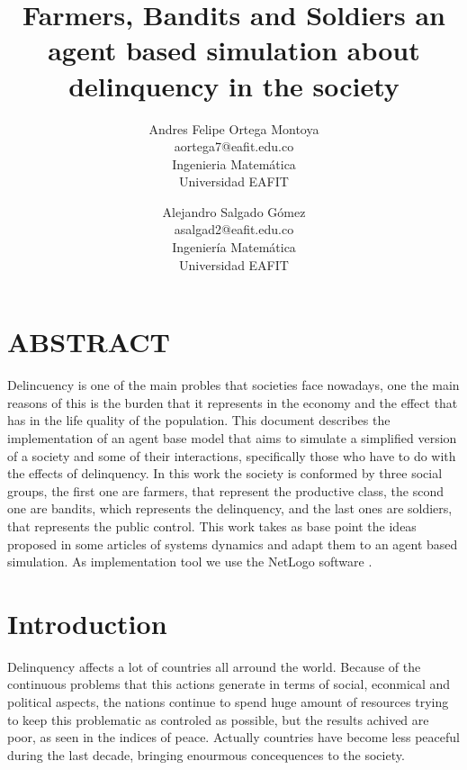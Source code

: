 \documentclass{wscpaperproc}
\theoremstyle{wsc}
\begin{document}

\title{Farmers, Bandits and Soldiers an agent based simulation about delinquency in the
       society}

\author{Andres Felipe Ortega Montoya\\ [12pt]
aortega7@eafit.edu.co\\
Ingenieria Matemática\\
Universidad EAFIT\\
\and
Alejandro Salgado Gómez\\[12pt]
asalgad2@eafit.edu.co\\
Ingeniería Matemática\\
Universidad EAFIT\\
}

\maketitle

\section*{ABSTRACT}
Delincuency is one of the main probles that societies face nowadays,
one the main reasons of this is the burden that it represents in the
economy and the effect that has in the life quality of the population.
This document describes the implementation of an agent base model that aims to
simulate a simplified version of a society and some of their interactions,
specifically those who have to do with the effects of delinquency.
In this work the society is conformed by three social groups, the
first one are farmers, that represent the productive class, the scond
one are bandits, which represents the delinquency, and the last ones
are soldiers, that represents the public control. This work takes as base point
the ideas proposed in some articles of systems dynamics and adapt them to an
agent based simulation. As implementation tool we use the NetLogo software
\cite{netlogo}.

\section{Introduction}

Delinquency affects a lot of countries all arround the world. Because of the
continuous problems that this actions generate in terms of social, econmical and
political aspects, the nations continue to spend huge amount of resources
trying to keep this problematic as controled as possible, but the results achived
are poor, as seen in the indices of peace. Actually countries have become
less peaceful during the last decade, bringing enourmous concequences to the
society. \cite{peace} \cite{violence}
\end{document}
